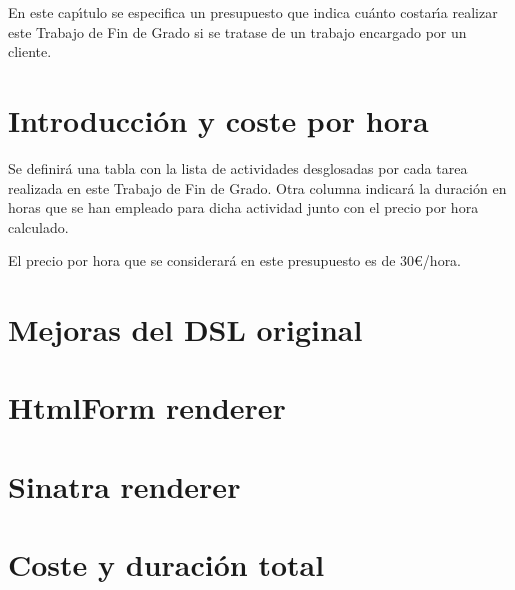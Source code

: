 

En este cap\'{\i}tulo se especifica un presupuesto que indica cu\'anto costar\'{\i}a realizar este Trabajo de Fin de Grado
si se tratase de un trabajo encargado por un cliente.

\section{Introducci\'on y coste por hora}
\label{7:sec:1}

Se definir\'a una tabla con la lista de actividades desglosadas por cada tarea realizada en este Trabajo de Fin de Grado. Otra columna indicar\'a la duraci\'on
en horas que se han empleado para dicha actividad junto con el precio por hora calculado.
\bigskip

El precio por hora que se considerar\'a en este presupuesto es de 30\euro{}/hora.
\newpage

\section{Mejoras del DSL original}
\label{7:sec:2}


\newpage

\section{HtmlForm renderer}
\label{7:sec:3}


\newpage

\section{Sinatra renderer}
\label{7:sec:4}



\section{Coste y duraci\'on total}
\label{7:sec:5}


